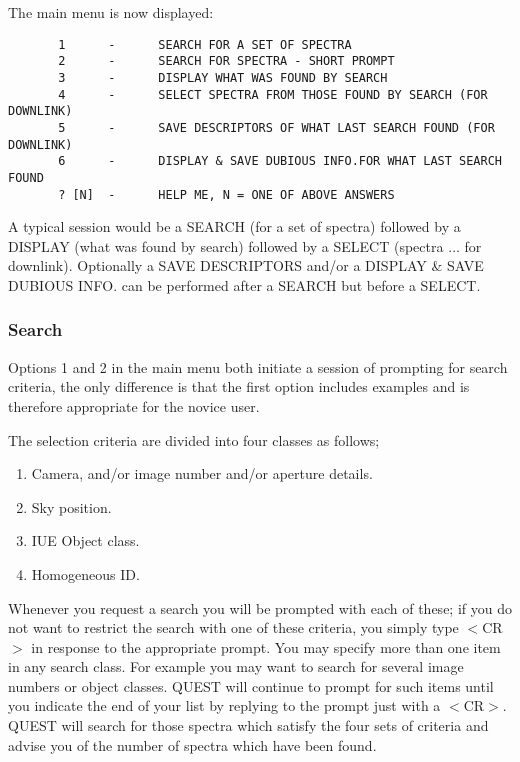The main menu is now displayed:
\begin{verbatim}
       1      -      SEARCH FOR A SET OF SPECTRA
       2      -      SEARCH FOR SPECTRA - SHORT PROMPT
       3      -      DISPLAY WHAT WAS FOUND BY SEARCH
       4      -      SELECT SPECTRA FROM THOSE FOUND BY SEARCH (FOR DOWNLINK)
       5      -      SAVE DESCRIPTORS OF WHAT LAST SEARCH FOUND (FOR DOWNLINK)
       6      -      DISPLAY & SAVE DUBIOUS INFO.FOR WHAT LAST SEARCH FOUND
       ? [N]  -      HELP ME, N = ONE OF ABOVE ANSWERS
\end{verbatim}
A typical session would be a SEARCH (for a set of spectra) followed 
by a DISPLAY (what was found by search)
followed by a SELECT (spectra $\ldots$ for downlink).
Optionally a SAVE DESCRIPTORS and/or a DISPLAY \& SAVE DUBIOUS INFO.
can be performed after a SEARCH but before a SELECT.

\subsubsection{Search}%
Options 1 and 2 in the main menu both initiate a session of prompting for search
criteria, the only difference is that the first option  includes examples
and is therefore appropriate for the novice user.

The selection criteria are divided into four classes as follows;
\begin{enumerate}
\item Camera, and/or image number and/or aperture details.
\item Sky position. 
\item IUE Object class. 
\item Homogeneous ID.
\end{enumerate}
Whenever you request a search you will be prompted with each of these;
if you do not want to restrict the search with one of these criteria,
you simply type $<$CR$>$ in response to the appropriate prompt.
You may specify more than one item in any search class. For
example you may want to search for several image numbers or object classes.
QUEST will continue to prompt for such items until you indicate the end of your
list by replying to the prompt just with a $<$CR$>$.
QUEST will search for those spectra which satisfy the four sets of 
criteria and advise you of the number of spectra which have been found.

